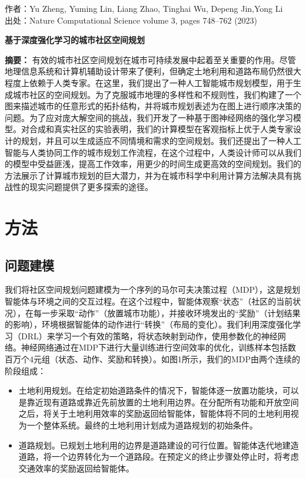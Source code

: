 
\songti
\noindent 作者：Yu Zheng, Yuming Lin, Liang Zhao, Tinghai Wu, Depeng Jin,Yong Li\\
\noindent 出处：Nature Computational Science volume 3, pages 748–762 (2023)
\vspace{2ex}

\begin{center}
    \textbf{基于深度强化学习的城市社区空间规划}
\end{center}

\noindent\textbf{摘要：} 有效的城市社区空间规划在城市可持续发展中起着至关重要的作用。尽管地理信息系统和计算机辅助设计带来了便利，但确定土地利用和道路布局仍然很大程度上依赖于人类专家。在这里，我们提出了一种人工智能城市规划模型，用于生成城市社区的空间规划。为了克服城市地理的多样性和不规则性，我们构建了一个图来描述城市的任意形式的拓扑结构，并将城市规划表述为在图上进行顺序决策的问题。为了应对庞大解空间的挑战，我们开发了一种基于图神经网络的强化学习模型。对合成和真实社区的实验表明，我们的计算模型在客观指标上优于人类专家设计的规划，并且可以生成适应不同情境和需求的空间规划。我们还提出了一种人工智能与人类协同工作的城市规划工作流程，在这个过程中，人类设计师可以从我们的模型中受益匪浅，提高工作效率，用更少的时间生成更高效的空间规划。我们的方法展示了计算城市规划的巨大潜力，并为在城市科学中利用计算方法解决具有挑战性的现实问题提供了更多探索的途径。

\section{方法}
\subsection{问题建模}
我们将社区空间规划问题建模为一个序列的马尔可夫决策过程（MDP），这是规划智能体与环境之间的交互过程。在这个过程中，智能体观察“状态”（社区的当前状况），在每一步采取“动作”（放置城市功能），并接收环境发出的“奖励”（计划结果的影响），环境根据智能体的动作进行“转换”（布局的变化）。我们利用深度强化学习（DRL）来学习一个有效的策略，将状态映射到动作，使用参数化的神经网络。神经网络通过在MDP下进行大量训练进行空间效率的优化，训练样本包括数百万个4元组（状态、动作、奖励和转换）。如图1所示，我们的MDP由两个连续的阶段组成：

\begin{itemize}
    \item 土地利用规划。在给定初始道路条件的情况下，智能体逐一放置功能块，可以是靠近现有道路或靠近先前放置的土地利用边界。在分配所有功能和开放空间之后，将关于土地利用效率的奖励返回给智能体，智能体将不同的土地利用视为一个整体系统。最终的土地利用计划成为道路规划的初始条件。
    \item 道路规划。已规划土地利用的边界是道路建设的可行位置。智能体迭代地建造道路，将一个边界转化为一个道路段。在预定义的终止步骤处停止时，将考虑交通效率的奖励返回给智能体。
\end{itemize}

